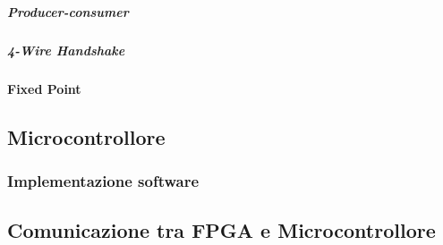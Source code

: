 				\subparagraph{Producer-consumer}
			
				\subparagraph{4-Wire Handshake}
			
			\paragraph{Fixed Point}
	
	\subsection{Microcontrollore}
	
		\subsubsection{Implementazione software}
	
	\subsection{Comunicazione tra FPGA e Microcontrollore}
